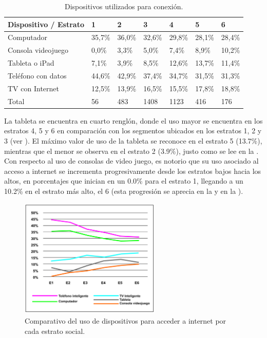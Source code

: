\documentclass[spanish]{textolivre}
\begin{document}
\begin{table}[htpb]
\caption{Dispositivos utilizados para conexión.}
\label{tab1}
\centering
\begin{tabular}{lllllll}
\toprule 
Dispositivo / Estrato & 1 & 2 & 3 & 4 & 5 & 6
\\ 
\midrule
Computador & 35,7\% & 36,0\% & 32,6\% & 29,8\% & 28,1\% & 28,4\%
\\
Consola videojuego & 0,0\% & 3,3\% & 5,0\% & 7,4\% & 8,9\% & 10,2\%
\\
Tableta o iPad & 7,1\% & 3,9\% & 8,5\% & 12,6\% & 13,7\% & 11,4\%
\\
Teléfono con datos & 44,6\% & 42,9\% & 37,4\% & 34,7\% & 31,5\% & 31,3\%
\\
TV con Internet & 12,5\% & 13,9\% & 16,5\% & 15,5\% & 17,8\% & 18,8\%
\\
\midrule
Total & 56 & 483 & 1408 & 1123 & 416 & 176
\\ 
\bottomrule
\end{tabular}
\end{table}

La tableta se encuentra en cuarto renglón, donde el uso mayor se encuentra en los estratos 4, 5 y 6 en comparación con los segmentos ubicados en los estratos 1, 2 y 3 (ver ). El máximo valor de uso de la tableta se reconoce en el estrato 5 (13.7\%), mientras que el menor se observa en el estrato 2 (3.9\%), justo como se lee en la . Con respecto al uso de consolas de video juego, es notorio que su uso asociado al acceso a internet se incrementa progresivamente desde los estratos bajos hacia los altos, en porcentajes que inician en un 0.0\% para el estrato 1, llegando a un 10.2\% en el estrato más alto, el 6 (esta progresión se aprecia en la  y en la ). 

\begin{figure}[htbp]
 \centering
 \includegraphics[width=0.6\textwidth]{fig1.jpg}
 \caption{Comparativo del uso de dispositivos para acceder a internet por cada estrato social.}
 \label{fig1}
\end{figure}
\end{document}
